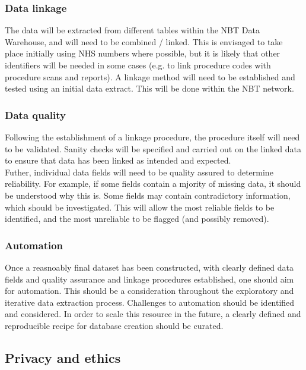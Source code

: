 \documentclass{article}
\begin{document}
\subsubsection{Data linkage}

The data will be extracted from different tables within the NBT Data
Warehouse, and will need to be combined / linked. This is envisaged to
take place initially using NHS numbers where possible, but it is
likely that other identifiers will be needed in some cases (e.g. to
link procedure codes with procedure scans and reports). A linkage
method will need to be established and tested using an initial data
extract. This will be done within the NBT network.

\subsubsection{Data quality}

Following the establishment of a linkage procedure, the procedure
itself will need to be validated. Sanity checks will be specified and
carried out on the linked data to ensure that data has been linked as
intended and expected.\\

Futher, individual data fields will need to be quality assured to
determine reliability. For example, if some fields contain a mjority
of missing data, it should be understood why this is. Some fields may
contain contradictory information, which should be investigated. This
will allow the most reliable fields to be identified, and the most
unreliable to be flagged (and possibly removed).

\subsubsection{Automation}

Once a reasnoably final dataset has been constructed, with clearly defined
data fields and quality assurance and linkage procedures
established, one should aim for automation. This should be a
consideration throughout the exploratory and iterative data extraction
process. Challenges to automation should be identified and
considered. In order to scale this resource in the future, a clearly
defined and reproducible recipe for database creation should be
curated. 


\subsection{Privacy and ethics}
\end{document}
